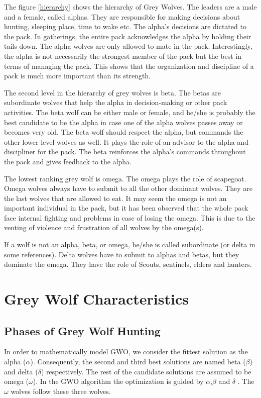 \documentclass[11pt]{report}
\begin{document}
\par The figure \ref{hierarchy} shows the hierarchy of Grey Wolves. The leaders are a male and a female, called alphas. They are responsible for making decisions about hunting, sleeping place, time to wake etc. The alpha’s decisions are dictated to the pack. In gatherings, the entire pack acknowledges the alpha by holding their tails down. The alpha wolves are only allowed to mate in the pack. Interestingly, the alpha is not necessarily the strongest member of the pack but the best in terms of managing the pack. This shows that the organization and discipline of a pack is much more important than its strength.
\par The second level in the hierarchy of grey wolves is beta. The betas are subordinate wolves that help the alpha in decision-making or other pack activities. The beta wolf can be either male or female, and he/she is probably the best candidate to be the alpha in case one of the alpha wolves passes away or becomes very old. The beta wolf should respect the alpha, but commands the other lower-level wolves as well. It plays the role of an advisor to the alpha and discipliner for the pack. The beta reinforces the alpha's commands throughout the pack and gives feedback to the alpha.
\par The lowest ranking grey wolf is omega. The omega plays the role of scapegoat. Omega wolves always have to submit to all the other dominant wolves. They are the last wolves that are allowed to eat. It may seem the omega is not an important individual in the pack, but it has been observed that the whole pack face internal fighting and problems in case of losing the omega. This is due to the venting of violence and frustration of all wolves by the omega(s).
\par If a wolf is not an alpha, beta, or omega, he/she is called subordinate (or delta in some references). Delta
wolves have to submit to alphas and betas, but they dominate the omega. They have the role of Scouts, sentinels, elders and hunters.


\chapter{Grey Wolf Characteristics}
\section{Phases of Grey Wolf Hunting}
In  order  to  mathematically  model  GWO,  we  consider  the fittest solution as the alpha ($\alpha$). Consequently, the second and third best solutions are named beta ($\beta$) and delta ($\delta$) respectively.  The rest of the candidate solutions are assumed to be omega ($\omega$). In the GWO algorithm the optimization is guided by $\alpha$,$\beta$ and $\delta$ . The $\omega$ wolves follow these three wolves.  
\end{document}
